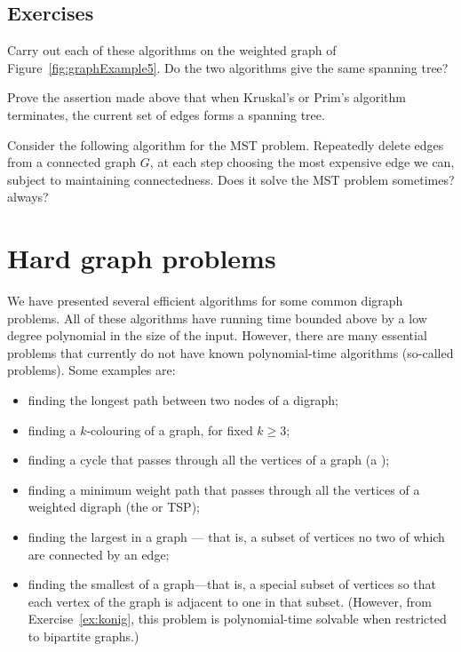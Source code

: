 \subsection*{Exercises}

\begin{Exercise} \label{ex:doMST}
Carry out each of these algorithms on the weighted
graph of Figure~\ref{fig:graphExample5}. Do the two algorithms give the
same spanning tree? 
\end{Exercise}

\begin{Exercise} \label{ex:spanning-tree}
Prove the assertion made above that when Kruskal's or Prim's algorithm 
terminates, the current set of edges forms a spanning tree.
\end{Exercise}

\begin{Exercise}\label{ex:silly-MST}
Consider the following algorithm for the MST problem. Repeatedly delete
edges from a connected graph $G$, at each step choosing the most
expensive edge we can, subject to maintaining connectedness. Does it
solve the MST problem sometimes? always?
\end{Exercise}

\section{Hard graph problems}
\label{sec:hardgraph}
We have presented several efficient algorithms for some common digraph
problems. All of these algorithms have running time bounded above by a low
degree polynomial in the size of the input. However, there are many
essential problems that currently do not have known polynomial-time
algorithms (so-called  problems). Some examples
are:
\begin{itemize}
\item finding the longest path between two nodes of
a digraph;
\item finding a $k$-colouring of a graph, for fixed $k\geq
3$;
\item finding a cycle that passes through all the vertices of
a graph (a );
\item finding a
minimum weight path that passes through all the vertices of a weighted
digraph (the  or TSP);
\item finding the largest  in a graph --- that is, 
a subset of vertices no two of which are connected by an edge;
\item finding the smallest 
 of a graph---that is, a special subset of
vertices so that each vertex of the graph is adjacent to one in that
subset. (However, from Exercise~\ref{ex:konig}, this problem 
is polynomial-time solvable when restricted to bipartite graphs.)

\end{itemize}


